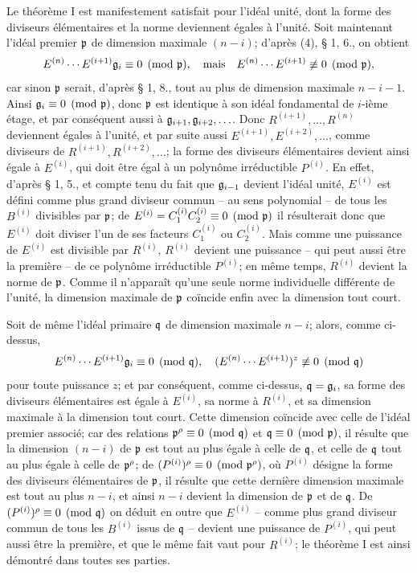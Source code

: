 Le théorème I est manifestement satisfait pour l'idéal unité, dont la forme des diviseurs élémentaires et la norme deviennent égales à l'unité. Soit maintenant l'idéal premier $\mathfrak p$ de dimension maximale $(n-i)$; d'après (4), \S{} 1, 6., on obtient
\[
 E^{(n)}\cdots E^{(i+1)}\mathfrak g_i\equiv0\pmod{\mathfrak p},\quad\hbox{mais}\quad
 E^{(n)}\cdots E^{(i+1)}\not\equiv0\pmod{\mathfrak p},
\]
car sinon $\mathfrak p$ serait, d'après \S{} 1, 8., tout au plus de dimension maximale $n-i-1$. Ainsi $\mathfrak g_i\equiv0\pmod{\mathfrak p}$, donc $\mathfrak p$ est identique à son idéal fondamental de $i$-ième étage, et par conséquent aussi à $\mathfrak g_{i+1},\mathfrak g_{i+2},\ldots$. Donc $R^{(i+1)},\ldots,R^{(n)}$ deviennent égales à l'unité, et par suite aussi $E^{(i+1)},E^{(i+2)},\ldots$, comme diviseurs de $R^{(i+1)},R^{(i+2)},\ldots$; la forme des diviseurs élémentaires devient ainsi égale à $E^{(i)}$, qui doit être égal à un polynôme irréductible $P^{(i)}$. En effet, d'après \S{} 1, 5., et compte tenu du fait que $\mathfrak g_{i-1}$ devient l'idéal unité, $E^{(i)}$ est défini comme plus grand diviseur commun -- au sens polynomial -- de tous les $B^{(i)}$ divisibles par $\mathfrak p$; de $E^{(i)}=C_1^{(i)}C_2^{(i)}\equiv0\pmod{\mathfrak p}$ il résulterait donc que $E^{(i)}$ doit diviser l'un de ses facteurs $C_1^{(i)}$ ou $C_2^{(i)}$. Mais comme une puissance de $E^{(i)}$ est divisible par $R^{(i)}$, $R^{(i)}$ devient une puissance -- qui peut aussi être la première -- de ce polynôme irréductible $P^{(i)}$; en même temps, $R^{(i)}$ devient la norme de $\mathfrak p$. Comme il n'apparaît qu'une seule norme individuelle différente de l'unité, la dimension maximale de $\mathfrak p$ coïncide enfin avec la dimension tout court.

Soit de même l'idéal primaire $\mathfrak q$ de dimension maximale $n-i$; alors, comme ci-dessus,
\[
 E^{(n)}\cdots E^{(i+1)}\mathfrak g_i\equiv0\pmod{\mathfrak q},\quad
 (E^{(n)}\cdots E^{(i+1)})^z\not\equiv0\pmod{\mathfrak q}
\]
pour toute puissance $z$; et par conséquent, comme ci-dessus, $\mathfrak q=\mathfrak g_i$, sa forme des diviseurs élémentaires est égale à $E^{(i)}$, sa norme à $R^{(i)}$, et sa dimension maximale à la dimension tout court. Cette dimension coïncide avec celle de l'idéal premier associé; car des relations $\mathfrak p^\rho\equiv0\pmod{\mathfrak q}$ et $\mathfrak q\equiv0\pmod{\mathfrak p}$, il résulte que la dimension $(n-i)$ de $\mathfrak p$ est tout au plus égale à celle de $\mathfrak q$, et celle de $\mathfrak q$ tout au plus égale à celle de $\mathfrak p^\rho$; de $(P^{(i)})^\rho\equiv0\pmod{\mathfrak p^\rho}$, où $P^{(i)}$ désigne la forme des diviseurs élémentaires de $\mathfrak p$, il résulte que cette dernière dimension maximale est tout au plus $n-i$, et ainsi $n-i$ devient la dimension de $\mathfrak p$ et de $\mathfrak q$. De $(P^{(i)})^\rho\equiv0\pmod{\mathfrak q}$ on déduit en outre que $E^{(i)}$ -- comme plus grand diviseur commun de tous les $B^{(i)}$ issus de $\mathfrak q$ -- devient une puissance de $P^{(i)}$, qui peut aussi être la première, et que le même fait vaut pour $R^{(i)}$; le théorème I est ainsi démontré dans toutes ses parties.

